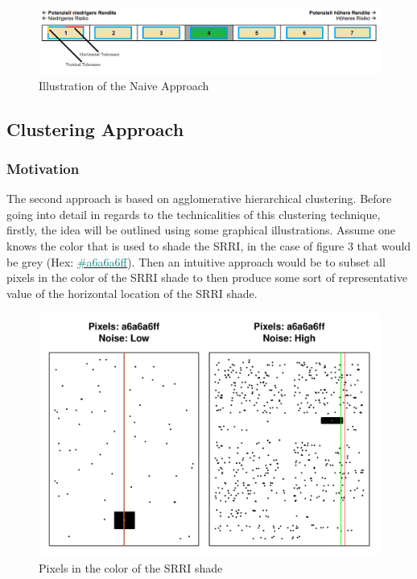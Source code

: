 \documentclass[aodsor,preprint]{imsart}
\numberwithin{equation}{section}
\theoremstyle{plain}
\begin{document}
\begin{figure}[H]
	\includegraphics[width = 12cm]{example_SRRI_graph_naive}
	\caption{Illustration of the Naive Approach}
\end{figure}
\newpage
\subsection{Clustering Approach}
\subsubsection{Motivation}
The second approach is based on agglomerative hierarchical clustering. Before going into detail in regards to the technicalities of this clustering technique, firstly, the idea will be outlined using some graphical illustrations. Assume one knows the color that is used to shade the SRRI, in the case of figure 3 that would be grey (Hex: \href{https://www.color-hex.com/color/a6a6a6}{\textcolor{teal}{\#a6a6a6ff}}). Then an intuitive approach would be to subset all pixels in the color of the SRRI shade to then produce some sort of representative value of the horizontal location of the SRRI shade.

\begin{figure}[H]
	\includegraphics[width = 12cm]{highnoiselownoise.pdf}
	\caption{Pixels in the color of the SRRI shade}
\end{figure}
\end{document}
